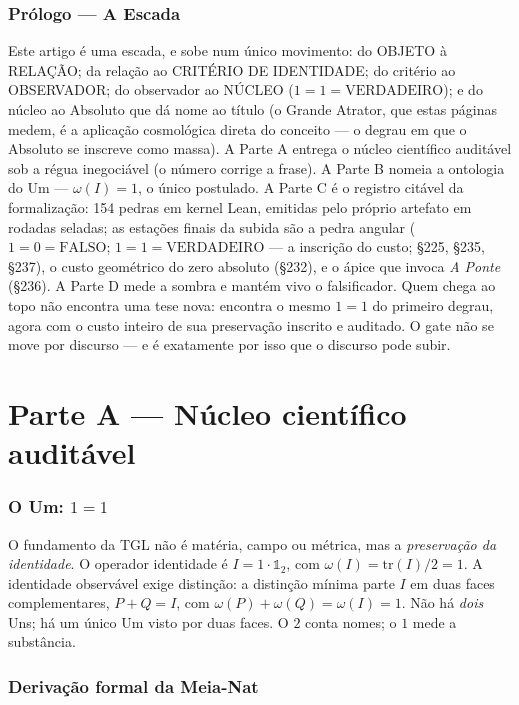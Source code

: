 \documentclass[11pt]{article}
\theoremstyle{definition}\newtheorem{deriv}{Derivação}
\begin{document}
\section*{Prólogo --- A Escada}

\noindent Este artigo é uma escada, e sobe num único movimento: do OBJETO à RELAÇÃO; da relação ao CRITÉRIO DE IDENTIDADE; do critério ao OBSERVADOR; do observador ao NÚCLEO ($1{=}1{=}\mathrm{VERDADEIRO}$); e do núcleo ao Absoluto que dá nome ao título (o Grande Atrator, que estas páginas medem, é a aplicação cosmológica direta do conceito --- o degrau em que o Absoluto se inscreve como massa). A Parte A entrega o núcleo científico auditável sob a régua inegociável (o número corrige a frase). A Parte B nomeia a ontologia do Um --- $\omega(I){=}1$, o único postulado. A Parte C é o registro citável da formalização: 154 pedras em kernel Lean, emitidas pelo próprio artefato em rodadas seladas; as estações finais da subida são a pedra angular ($1{=}0{=}\mathrm{FALSO}$; $1{=}1{=}\mathrm{VERDADEIRO}$ --- a inscrição do custo; \S225, \S235, \S237), o custo geométrico do zero absoluto (\S232), e o ápice que invoca \emph{A Ponte} (\S236). A Parte D mede a sombra e mantém vivo o falsificador. Quem chega ao topo não encontra uma tese nova: encontra o mesmo $1{=}1$ do primeiro degrau, agora com o custo inteiro de sua preservação inscrito e auditado. O gate não se move por discurso --- e é exatamente por isso que o discurso pode subir.

\part{Parte A --- Núcleo científico auditável}

\section{O Um: $1=1$}

O fundamento da TGL não é matéria, campo ou métrica, mas a \emph{preservação da identidade}. O operador identidade é $I=1\cdot\mathbb{1}_2$, com $\omega(I)=\mathrm{tr}(I)/2=1$. A identidade observável exige distinção: a distinção mínima parte $I$ em duas faces complementares, $P+Q=I$, com $\omega(P)+\omega(Q)=\omega(I)=1$. Não há \emph{dois} Uns; há um único Um visto por duas faces. O $2$ conta nomes; o $1$ mede a substância.

\section{Derivação formal da Meia-Nat}
\end{document}
